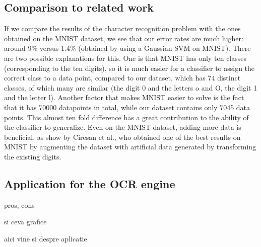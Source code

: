 \subsection{Comparison to related work}
If we compare the results of the character recognition problem with the ones obtained on the MNIST dataset\cite{lecun1998mnist}, we see that our error rates are much higher: around 9\% versus 1.4\% (obtained by using a Gaussian SVM on MNIST). There are two possible explanations for this. One is that MNIST has only ten classes (corresponding to the ten digits), so it is much easier for a classifier to assign the correct class to a data point, compared to our dataset, which has 74 distinct classes, of which many are similar (the digit 0 and the letters o and O, the digit 1 and the letter l). Another factor that makes MNIST easier to solve is the fact that it has 70000 datapoints in total, while our dataset contains only 7045 data points. This almost ten fold difference has a great contribution to the ability of the classifier to generalize. Even on the MNIST dataset, adding more data is beneficial, as show by Ciresan et al.\cite{Cire_an_2010}, who obtained one of the best results on MNIST by augmenting the dataset with artificial data generated by transforming the existing digits. 



\subsection{Application for the OCR engine}
pros, cons

si ceva grafice 

aici vine si despre aplicatie


